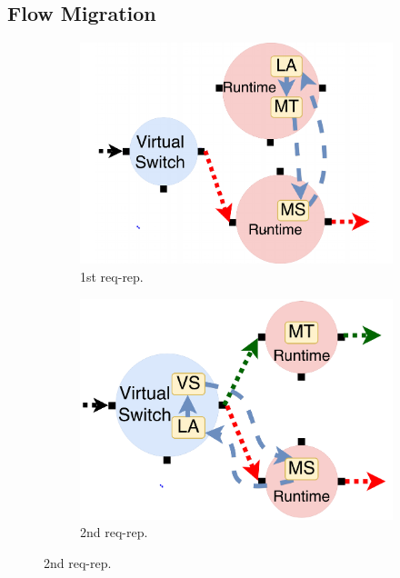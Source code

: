 \subsection{Flow Migration}
\label{sec:migration}

\begin{figure}[!t]
\begin{subfigure}[t]{0.33\linewidth}
   \centering
   \includegraphics[width=1.1\columnwidth]{figure/nfactor-mig1.pdf}
   \caption{1st req-rep.}\label{fig:mig1}
  \end{subfigure}\hfill
  \begin{subfigure}[t]{0.33\linewidth}
     \centering
     \includegraphics[width=1.1\columnwidth]{figure/nfactor-mig2.pdf}
     \caption{2nd req-rep.}\label{fig:mig2}
    \end{subfigure}\hfill

\end{figure}
